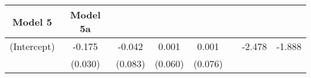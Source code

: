 \documentclass[12pt,twoside]{reedthesis}
\begin{document}
\begin{longtable}[]{@{}cccccccc@{}}
\begin{minipage}[b]{0.09\columnwidth}
  Model 5\strut
  \end{minipage} & \begin{minipage}[b]{0.10\columnwidth}\centering\strut
  Model 5a\strut
  \end{minipage}\tabularnewline
  \midrule
  \endhead
  \begin{minipage}[t]{0.12\columnwidth}\centering\strut
  (Intercept)\strut
  \end{minipage} & \begin{minipage}[t]{0.09\columnwidth}\centering\strut
  -0.175\strut
  \end{minipage} & \begin{minipage}[t]{0.09\columnwidth}\centering\strut
  -0.042\strut
  \end{minipage} & \begin{minipage}[t]{0.09\columnwidth}\centering\strut
  0.001\strut
  \end{minipage} & \begin{minipage}[t]{0.09\columnwidth}\centering\strut
  0.001\strut
  \end{minipage} & \begin{minipage}[t]{0.09\columnwidth}\centering\strut
  \strut
  \end{minipage} & \begin{minipage}[t]{0.09\columnwidth}\centering\strut
  -2.478\strut
  \end{minipage} & \begin{minipage}[t]{0.10\columnwidth}\centering\strut
  -1.888\strut
  \end{minipage}\tabularnewline
  \begin{minipage}[t]{0.12\columnwidth}\centering\strut
  \strut
  \end{minipage} & \begin{minipage}[t]{0.09\columnwidth}\centering\strut
  (0.030)\strut
  \end{minipage} & \begin{minipage}[t]{0.09\columnwidth}\centering\strut
  (0.083)\strut
  \end{minipage} & \begin{minipage}[t]{0.09\columnwidth}\centering\strut
  (0.060)\strut
  \end{minipage} & \begin{minipage}[t]{0.09\columnwidth}\centering\strut
  (0.076)\strut
  \end{minipage} & \begin{minipage}[t]{0.09\columnwidth}\centering\strut
  \strut
  \end{minipage} & \begin{minipage}[t]{0.09\columnwidth}\centering\strut

\end{minipage}
\end{longtable}
\end{document}
